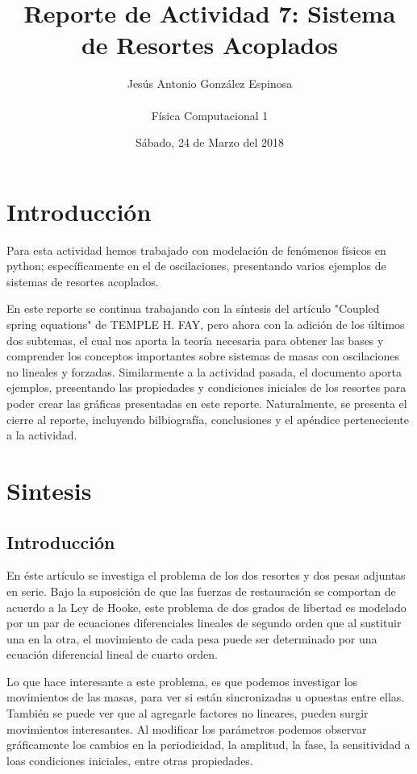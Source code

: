 \documentclass[a4paper]{article}
\title{Reporte de Actividad 7: Sistema de Resortes Acoplados}
\author{Jesús Antonio González Espinosa \\ \\ Física Computacional 1}
\date{Sábado, 24 de Marzo del 2018}
\begin{document}
\maketitle

\section{Introducción}

Para esta actividad hemos trabajado con modelación de fenómenos físicos en python; específicamente en el de oscilaciones, presentando varios ejemplos de sistemas de resortes acoplados.

En este reporte se continua trabajando con la síntesis del artículo "Coupled spring equations" de TEMPLE H. FAY, pero ahora con la adición de los últimos dos subtemas, el cual nos aporta la teoría necesaria para obtener las bases y comprender los conceptos importantes sobre sistemas de masas con oscilaciones no lineales y forzadas. Similarmente a la actividad pasada, el documento aporta ejemplos, presentando las propiedades y condiciones iniciales de los resortes para poder crear las gráficas presentadas en este reporte. Naturalmente, se presenta el cierre al reporte, incluyendo bilbiografía, conclusiones y el apéndice perteneciente a la actividad.


\section{Sintesis}
\subsection{Introducción}
En éste artículo se investiga el problema de los dos resortes y dos pesas adjuntas en serie. Bajo la suposición de que las fuerzas de restauración se comportan de acuerdo a la Ley de Hooke, este problema de dos grados de libertad es modelado por un par de ecuaciones diferenciales lineales de segundo orden que al sustituir una en la otra, el movimiento de cada pesa puede ser determinado por una ecuación diferencial lineal de cuarto orden. 

Lo que hace interesante a este problema, es que podemos investigar los movimientos de las masas, para ver si están sincronizadas u opuestas entre ellas. También se puede ver que al agregarle factores no lineares, pueden surgir movimientos interesantes. Al modificar los parámetros podemos observar gráficamente los cambios en la periodicidad, la amplitud, la fase, la sensitividad a loas condiciones iniciales, entre otras propiedades. 
\end{document}
